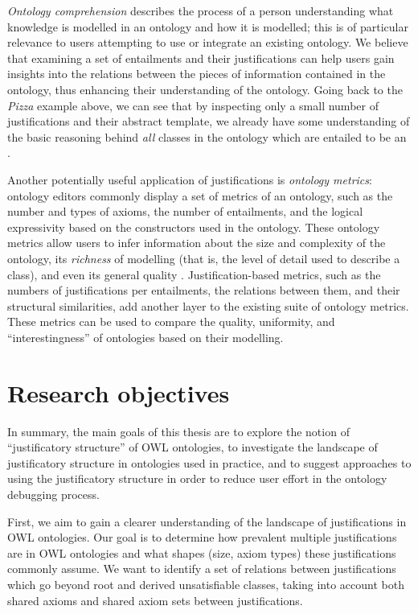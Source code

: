 \emph{Ontology comprehension} \cite{keet07pc,bauer09ru} describes the process of a person understanding what knowledge is modelled in an ontology and how it is modelled; this is of particular relevance to users attempting to use or integrate an existing ontology. We believe that examining a set of entailments and their justifications can help users gain insights into the relations between the pieces of information contained in the ontology, thus enhancing their understanding of the ontology. Going back to the \emph{Pizza} example above, we can see that by inspecting only a small number of justifications and their abstract template, we already have some understanding of the basic reasoning behind \emph{all} classes in the ontology which are entailed to be an .

Another potentially useful application of justifications is \emph{ontology metrics}: ontology editors commonly display a set of metrics of an ontology, such as the number and types of axioms, the number of entailments, and the logical expressivity based on the constructors used in the ontology. These ontology metrics allow users to infer information about the size and complexity of the ontology, its \emph{richness} of modelling (that is, the level of detail used to describe a class), and even its general quality \cite{tartir05im,alani06or}. Justification-based metrics, such as the numbers of justifications per entailments, the relations between them, and their structural similarities, add another layer to the existing suite of ontology metrics. These metrics can be used to compare the quality, uniformity, and \enquote{interestingness} of ontologies based on their modelling.


\section{Research objectives}

In summary, the main goals of this thesis are to explore the notion of  \enquote{justificatory structure} of OWL ontologies, to investigate the landscape of justificatory structure in ontologies used in practice, and to suggest approaches to using the justificatory structure in order to reduce user effort in the ontology debugging process.

First, we aim to gain a clearer understanding of the landscape of justifications in OWL ontologies. Our goal is to determine how prevalent multiple justifications are in OWL ontologies and what shapes (size, axiom types) these justifications commonly assume. We want to identify a set of relations between justifications which go beyond root and derived unsatisfiable classes, taking into account both shared axioms and shared axiom sets between justifications. 

